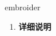 
\begin{frame}
{\huge embroider}
\begin{center}
\begin{enumerate}\Large
  \item \textbf{详细说明}
\end{enumerate}
\end{center}
\end{frame}
